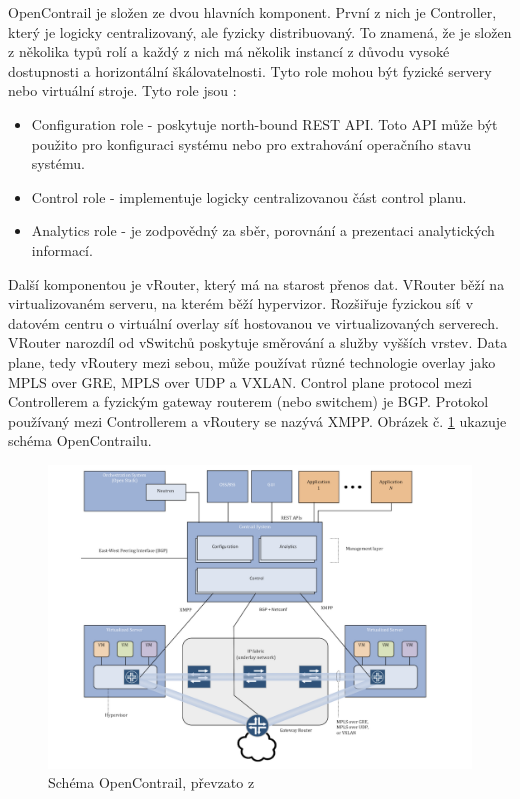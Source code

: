 OpenContrail je složen ze dvou hlavních komponent. První z nich je Controller, který je logicky centralizovaný, ale fyzicky distribuovaný. To znamená, že je složen z několika typů rolí a každý z nich má několik instancí z důvodu vysoké dostupnosti a horizontální škálovatelnosti. Tyto role mohou být fyzické servery nebo virtuální stroje. Tyto role jsou \cite{OpenContrail2}: 

\begin{itemize}
\item Configuration role - poskytuje north-bound REST API. Toto API může být použito pro konfiguraci systému nebo pro extrahování operačního stavu systému.
\item Control role - implementuje logicky centralizovanou část control planu.
\item Analytics role - je zodpovědný za sběr, porovnání a prezentaci analytických informací.
\end{itemize}

Další komponentou je vRouter, který má na starost přenos dat. VRouter běží na virtualizovaném serveru, na kterém běží hypervizor. Rozšiřuje fyzickou síť v datovém centru o virtuální overlay síť hostovanou ve virtualizovaných serverech. VRouter narozdíl od vSwitchů poskytuje směrování a služby vyšších vrstev. Data plane, tedy vRoutery mezi sebou, může používat různé technologie overlay jako MPLS over GRE, MPLS over UDP a VXLAN. Control plane protocol mezi Controllerem a fyzickým gateway routerem (nebo switchem) je BGP. Protokol používaný mezi Controllerem a vRoutery se nazývá XMPP. Obrázek č. \ref{fig:contrail} ukazuje schéma OpenContrailu.

\begin{figure}[h]
\begin{centering}
\includegraphics[scale=0.35]{images/contrail}
\par\end{centering}
\caption{Schéma OpenContrail, převzato z \cite{OpenContrail}\label{fig:contrail}}
\end{figure}

